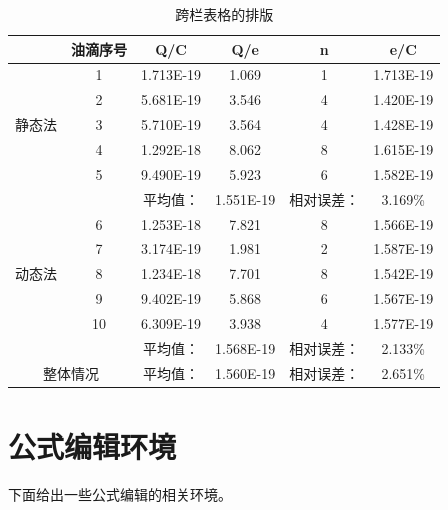 \documentclass[10pt,a4paper,twocolumn,twoside,UTF8]{ctexart}
\begin{document}

	\begin{table}[htbp]
	  \centering

	    \begin{tabular}{c|ccccc}
	    \toprule
	    \multicolumn{1}{c}{} & 油滴序号  & Q/C   & Q/e   & n     & e/C \\
	    \midrule
	    \multicolumn{1}{c}{\multirow{5}[2]{*}{静态法}} & 1     & 1.713E-19 & 1.069  & 1     & 1.713E-19 \\
	    \multicolumn{1}{c}{} & 2     & 5.681E-19 & 3.546  & 4     & 1.420E-19 \\
	    \multicolumn{1}{c}{} & 3     & 5.710E-19 & 3.564  & 4     & 1.428E-19 \\
	    \multicolumn{1}{c}{} & 4     & 1.292E-18 & 8.062  & 8     & 1.615E-19 \\
	    \multicolumn{1}{c}{} & 5     & 9.490E-19 & 5.923  & 6     & 1.582E-19 \\
	    \midrule
	    \multicolumn{1}{c}{} &       & 平均值：  & 1.551E-19 & 相对误差： & 3.169\% \\
	    \midrule
	    \multicolumn{1}{c}{\multirow{5}[2]{*}{动态法}} & 6     & 1.253E-18 & 7.821  & 8     & 1.566E-19 \\
	    \multicolumn{1}{c}{} & 7     & 3.174E-19 & 1.981  & 2     & 1.587E-19 \\
	    \multicolumn{1}{c}{} & 8     & 1.234E-18 & 7.701  & 8     & 1.542E-19 \\
	    \multicolumn{1}{c}{} & 9     & 9.402E-19 & 5.868  & 6     & 1.567E-19 \\
	    \multicolumn{1}{c}{} & 10    & 6.309E-19 & 3.938  & 4     & 1.577E-19 \\
	    \midrule
	    \multicolumn{1}{c}{} &       & 平均值：  & 1.568E-19 & 相对误差： & 2.133\% \\
	    \multicolumn{2}{c}{整体情况} & 平均值：  & 1.560E-19 & 相对误差： & 2.651\% \\
	    \bottomrule
	    \end{tabular}%
	 \caption{跨栏表格的排版}
	\end{table}%




\clearpage
\section{公式编辑环境}
下面给出一些公式编辑的相关环境。
\end{document}
